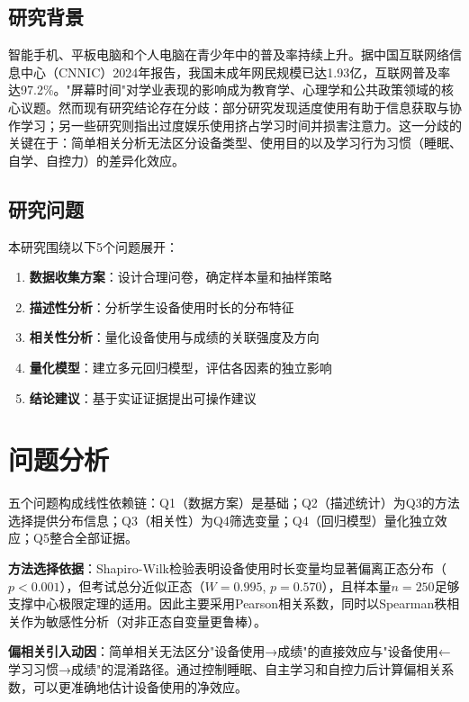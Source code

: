 \documentclass[11pt]{ctexart}
\begin{document}
\subsection{研究背景}

智能手机、平板电脑和个人电脑在青少年中的普及率持续上升。据中国互联网络信息中心（CNNIC）2024年报告，我国未成年网民规模已达1.93亿，互联网普及率达97.2\%。"屏幕时间"对学业表现的影响成为教育学、心理学和公共政策领域的核心议题。然而现有研究结论存在分歧：部分研究发现适度使用有助于信息获取与协作学习；另一些研究则指出过度娱乐使用挤占学习时间并损害注意力。这一分歧的关键在于：简单相关分析无法区分设备类型、使用目的以及学习行为习惯（睡眠、自学、自控力）的差异化效应。

\subsection{研究问题}

本研究围绕以下5个问题展开：
\begin{enumerate}[label=Q\arabic*:,leftmargin=*]
    \item \textbf{数据收集方案}：设计合理问卷，确定样本量和抽样策略
    \item \textbf{描述性分析}：分析学生设备使用时长的分布特征
    \item \textbf{相关性分析}：量化设备使用与成绩的关联强度及方向
    \item \textbf{量化模型}：建立多元回归模型，评估各因素的独立影响
    \item \textbf{结论建议}：基于实证证据提出可操作建议
\end{enumerate}

\section{问题分析}

五个问题构成线性依赖链：Q1（数据方案）是基础；Q2（描述统计）为Q3的方法选择提供分布信息；Q3（相关性）为Q4筛选变量；Q4（回归模型）量化独立效应；Q5整合全部证据。

\textbf{方法选择依据}：Shapiro-Wilk检验表明设备使用时长变量均显著偏离正态分布（$p<0.001$），但考试总分近似正态（$W=0.995$, $p=0.570$），且样本量$n=250$足够支撑中心极限定理的适用。因此主要采用Pearson相关系数，同时以Spearman秩相关作为敏感性分析（对非正态自变量更鲁棒）。

\textbf{偏相关引入动因}：简单相关无法区分"设备使用→成绩"的直接效应与"设备使用←学习习惯→成绩"的混淆路径。通过控制睡眠、自主学习和自控力后计算偏相关系数，可以更准确地估计设备使用的净效应。
\end{document}
